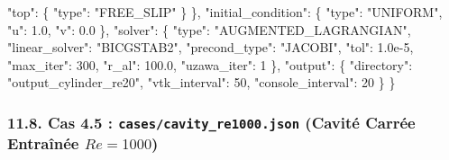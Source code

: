 \documentclass[
  french,
]{article}
\newenvironment{Shaded}{}{}
\newcommand{\DataTypeTok}[1]{\textcolor[rgb]{0.56,0.13,0.00}{#1}}
\newcommand{\DecValTok}[1]{\textcolor[rgb]{0.25,0.63,0.44}{#1}}
\newcommand{\FloatTok}[1]{\textcolor[rgb]{0.25,0.63,0.44}{#1}}
\newcommand{\FunctionTok}[1]{\textcolor[rgb]{0.02,0.16,0.49}{#1}}
\newcommand{\StringTok}[1]{\textcolor[rgb]{0.25,0.44,0.63}{#1}}
\begin{document}
\begin{Shaded}
\begin{Highlighting}[]
    \DataTypeTok{"top"}\FunctionTok{:}    \FunctionTok{\{} \DataTypeTok{"type"}\FunctionTok{:} \StringTok{"FREE\_SLIP"} \FunctionTok{\}}
  \FunctionTok{\},}
  \DataTypeTok{"initial\_condition"}\FunctionTok{:} \FunctionTok{\{} \DataTypeTok{"type"}\FunctionTok{:} \StringTok{"UNIFORM"}\FunctionTok{,} \DataTypeTok{"u"}\FunctionTok{:} \FloatTok{1.0}\FunctionTok{,} \DataTypeTok{"v"}\FunctionTok{:} \FloatTok{0.0} \FunctionTok{\},}
  \DataTypeTok{"solver"}\FunctionTok{:} \FunctionTok{\{}
    \DataTypeTok{"type"}\FunctionTok{:} \StringTok{"AUGMENTED\_LAGRANGIAN"}\FunctionTok{,}
    \DataTypeTok{"linear\_solver"}\FunctionTok{:} \StringTok{"BICGSTAB2"}\FunctionTok{,}
    \DataTypeTok{"precond\_type"}\FunctionTok{:} \StringTok{"JACOBI"}\FunctionTok{,}
    \DataTypeTok{"tol"}\FunctionTok{:} \FloatTok{1.0e{-}5}\FunctionTok{,} \DataTypeTok{"max\_iter"}\FunctionTok{:} \DecValTok{300}\FunctionTok{,} \DataTypeTok{"r\_al"}\FunctionTok{:} \FloatTok{100.0}\FunctionTok{,} \DataTypeTok{"uzawa\_iter"}\FunctionTok{:} \DecValTok{1}
  \FunctionTok{\},}
  \DataTypeTok{"output"}\FunctionTok{:} \FunctionTok{\{} \DataTypeTok{"directory"}\FunctionTok{:} \StringTok{"output\_cylinder\_re20"}\FunctionTok{,} \DataTypeTok{"vtk\_interval"}\FunctionTok{:} \DecValTok{50}\FunctionTok{,} \DataTypeTok{"console\_interval"}\FunctionTok{:} \DecValTok{20} \FunctionTok{\}}
\FunctionTok{\}}
\end{Highlighting}
\end{Shaded}

\subsubsection{\texorpdfstring{11.8. Cas 4.5 :
\texttt{cases/cavity\_re1000.json} (Cavité Carrée Entraînée
\(Re=1000\))}{11.8. Cas 4.5 : cases/cavity\_re1000.json (Cavité Carrée Entraînée Re=1000)}}\label{cas-4.5-casescavity_re1000.json-cavituxe9-carruxe9e-entrauxeenuxe9e-re1000}
\end{document}
